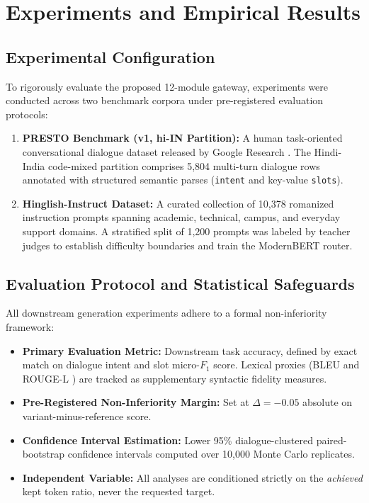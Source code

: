 
\chapter{Experiments and Empirical Results}
\label{chap:experiments}

\section{Experimental Configuration}
To rigorously evaluate the proposed 12-module gateway, experiments were conducted across two benchmark corpora under pre-registered evaluation protocols:

\begin{enumerate}
    \item \textbf{PRESTO Benchmark (v1, hi-IN Partition):} A human task-oriented conversational dialogue dataset released by Google Research \cite{goel2023presto}. The Hindi-India code-mixed partition comprises 5,804 multi-turn dialogue rows annotated with structured semantic parses (\texttt{intent} and key-value \texttt{slots}).
    \item \textbf{Hinglish-Instruct Dataset:} A curated collection of 10,378 romanized instruction prompts spanning academic, technical, campus, and everyday support domains. A stratified split of 1,200 prompts was labeled by teacher judges to establish difficulty boundaries and train the ModernBERT router.
\end{enumerate}

\section{Evaluation Protocol and Statistical Safeguards}
All downstream generation experiments adhere to a formal non-inferiority framework:
\begin{itemize}
    \item \textbf{Primary Evaluation Metric:} Downstream task accuracy, defined by exact match on dialogue intent and slot micro-$F_1$ score. Lexical proxies (BLEU \cite{papineni2002bleu} and ROUGE-L \cite{lin2004rouge}) are tracked as supplementary syntactic fidelity measures.
    \item \textbf{Pre-Registered Non-Inferiority Margin:} Set at $\Delta = -0.05$ absolute on variant-minus-reference score.
    \item \textbf{Confidence Interval Estimation:} Lower 95\% dialogue-clustered paired-bootstrap confidence intervals computed over 10,000 Monte Carlo replicates.
    \item \textbf{Independent Variable:} All analyses are conditioned strictly on the \textit{achieved} kept token ratio, never the requested target.
\end{itemize}

